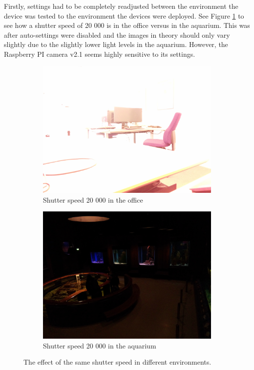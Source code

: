 Firstly, settings had to be completely readjusted between the environment the device was tested to the environment the devices were deployed. See Figure \ref{fig:capture_environment_settings} to see how a shutter speed of 20 000 is in the office versus in the aquarium. This was after auto-settings were disabled and the images in theory should only vary slightly due to the slightly lower light levels in the aquarium. However, the Raspberry PI camera v2.1 seems highly sensitive to its settings.

\begin{figure}[H]
    \centering
    \begin{subfigure}{0.49\textwidth}
        \centering
        \includegraphics[width=\textwidth]{Images/DeviceImages/2nd-iteration/ss20000_office.jpg}
        \caption{Shutter speed 20 000 in the office}
    \end{subfigure}
    \hfill
    \begin{subfigure}{0.49\textwidth}
        \centering
        \includegraphics[width=\textwidth]{Images/DeviceImages/2nd-iteration/ss20000_fimus.jpg}
        \caption{Shutter speed 20 000 in the aquarium}
    \end{subfigure}
    \caption{The effect of the same shutter speed in different environments.}
    \label{fig:capture_environment_settings}
\end{figure}

